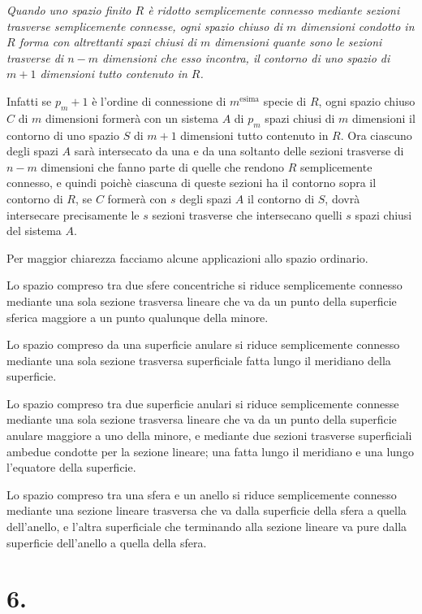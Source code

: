 \documentclass{article}
\begin{document}
\emph{Quando uno spazio finito $R$ è ridotto semplicemente connesso mediante sezioni trasverse semplicemente connesse, ogni spazio chiuso di $m$ dimensioni condotto in $R$ forma con altrettanti spazi chiusi di $m$ dimensioni quante sono le sezioni trasverse di $n-m$ dimensioni che esso incontra, il contorno di uno spazio di $m+1$ dimensioni tutto contenuto in $R$.}

Infatti se $p_{m}+1$ è l'ordine di connessione di $m^{\text{esima}}$ specie di $R$, ogni spazio chiuso $C$ di $m$ dimensioni formerà con un sistema $A$ di $p_{m}$ spazi chiusi di $m$ dimensioni il contorno di uno spazio $S$ di $m+1$ dimensioni tutto contenuto in $R$. Ora ciascuno degli spazi $A$ sarà intersecato da una e da una soltanto delle sezioni trasverse di $n-m$ dimensioni che fanno parte di quelle che rendono $R$ semplicemente connesso, e quindi poichè ciascuna di queste sezioni ha il contorno sopra il contorno di $R$, se $C$ formerà con $s$ degli spazi $A$ il contorno di $S$, dovrà intersecare precisamente le $s$ sezioni trasverse che intersecano quelli $s$ spazi chiusi del sistema $A$.

Per maggior chiarezza facciamo alcune applicazioni allo spazio ordinario.

Lo spazio compreso tra due sfere concentriche si riduce semplicemente connesso mediante una sola sezione trasversa lineare che va da un punto della superficie sferica maggiore a un punto qualunque della minore.

Lo spazio compreso da una superficie anulare si riduce semplicemente connesso mediante una sola sezione trasversa superficiale fatta lungo il meridiano della superficie.


Lo spazio compreso tra due superficie anulari si riduce semplicemente connesse mediante una sola sezione trasversa lineare che va da un punto della superficie anulare maggiore a uno della minore, e mediante due sezioni trasverse superficiali ambedue condotte per la sezione lineare; una fatta lungo il meridiano e una lungo l'equatore della superficie.

Lo spazio compreso tra una sfera e un anello si riduce semplicemente connesso mediante una sezione lineare trasversa che va dalla superficie della sfera a quella dell'anello, e l'altra superficiale che terminando alla sezione lineare va pure dalla superficie dell'anello a quella della sfera.

\section*{6.}
\end{document}
